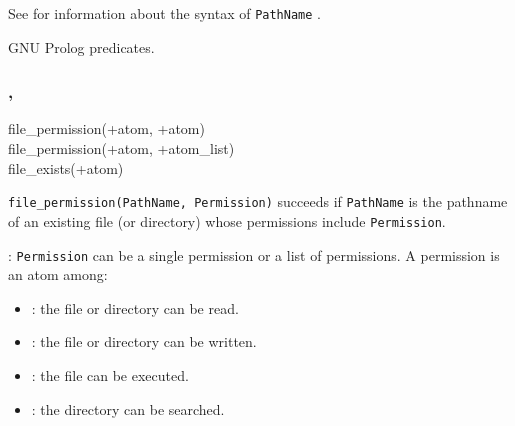 See  for information about the syntax of
\texttt{PathName} .

\begin{PlErrors}





\end{PlErrors}

\Portability

GNU Prolog predicates.

\subsubsection{,\label{file-permission/2}
               }

\begin{TemplatesOneCol}
file\_permission(+atom, +atom)\\
file\_permission(+atom, +atom\_list)\\
file\_exists(+atom)

\end{TemplatesOneCol}

\Description

\texttt{file\_permission(PathName, Permission)} succeeds if
\texttt{PathName} is the pathname of an existing file (or directory) whose
permissions include \texttt{Permission}.

: \texttt{Permission} can be a single permission or
a list of permissions. A permission is an atom among:

\begin{itemize}

\item {}: the file or directory can be read.

\item {}: the file or directory can be written.

\item {}: the file can be executed.

\item {}: the directory can be searched.

\end{itemize}

